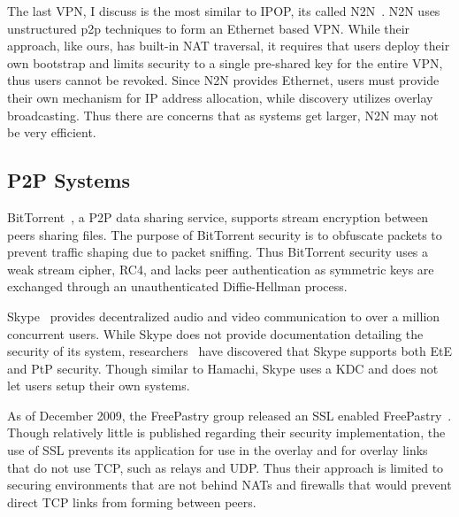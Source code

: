 The last VPN, I discuss is the most similar to IPOP, its called N2N~\cite{n2n}.
N2N uses unstructured p2p techniques to form an Ethernet based VPN.  While
their approach, like ours, has built-in NAT traversal, it requires that users
deploy their own bootstrap and limits security to a single pre-shared key for
the entire VPN, thus users cannot be revoked.  Since N2N provides Ethernet,
users must provide their own mechanism for IP address allocation, while
discovery utilizes overlay broadcasting.  Thus there are concerns that as
systems get larger, N2N may not be very efficient.

\subsection{P2P Systems}

BitTorrent~\cite{bittorrent_security}, a P2P data sharing service,  supports
stream encryption between peers sharing files.  The purpose of BitTorrent
security is to obfuscate packets to prevent traffic shaping due to packet
sniffing. Thus BitTorrent security uses a weak stream cipher, RC4, and lacks
peer authentication as symmetric keys are exchanged through an unauthenticated
Diffie-Hellman process.

Skype~\cite{skype} provides decentralized audio and video communication to over
a million concurrent users.  While Skype does not provide documentation
detailing the security of its system, researchers~\cite{skype_auth,
skype_overview} have discovered that Skype supports both EtE and PtP security.
Though similar to Hamachi, Skype uses a KDC and does not let users setup their
own systems.

As of December 2009, the FreePastry group released an SSL enabled
FreePastry~\cite{pastry}.  Though relatively little is published regarding
their security implementation, the use of SSL prevents its application for use
in the overlay and for overlay links that do not use TCP, such as relays and
UDP.  Thus their approach is limited to securing environments that are not
behind NATs and firewalls that would prevent direct TCP links from forming
between peers.
